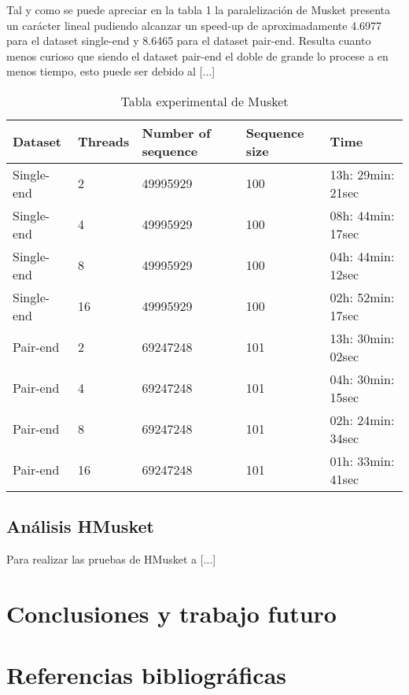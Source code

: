 \documentclass[conference]{IEEEtran}
\begin{document}
Tal y como se puede apreciar en la tabla 1 la paralelización de Musket presenta un carácter lineal pudiendo alcanzar un speed-up de aproximadamente 4.6977 para el dataset single-end y 8.6465 para el dataset pair-end. Resulta cuanto menos curioso que siendo el dataset pair-end el doble de grande lo procese a en menos tiempo, esto puede ser debido al [...]

\begin{table}[]
	\centering
	\caption{Tabla experimental de Musket}
	\label{tabla 1}
	\begin{tabular}{|l|l|l|l|l|}
		\hline
		Dataset 	& Threads 	& Number of sequence & Sequence size & Time 				\\ \hline
		Single-end 	& 2			& 49995929           & 100           & 13h: 29min: 21sec 	\\ \hline
		Single-end 	& 4			& 49995929           & 100           & 08h: 44min: 17sec	\\ \hline
		Single-end 	& 8			& 49995929           & 100           & 04h: 44min: 12sec 	\\ \hline
		Single-end 	& 16		& 49995929           & 100           & 02h: 52min: 17sec 	\\ \hline \hline
		Pair-end 	& 2			& 69247248           & 101           & 13h: 30min: 02sec 	\\ \hline
		Pair-end 	& 4			& 69247248           & 101           & 04h: 30min: 15sec	\\ \hline
		Pair-end 	& 8			& 69247248           & 101           & 02h: 24min: 34sec 	\\ \hline
		Pair-end 	& 16		& 69247248           & 101           & 01h: 33min: 41sec 	\\ \hline
	\end{tabular}
\end{table}

\subsection{Análisis HMusket}
Para realizar las pruebas de HMusket a [...]

\section{Conclusiones y trabajo futuro}

\section*{Referencias bibliográficas}
\end{document}
